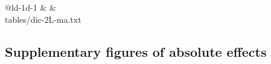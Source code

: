 \documentclass[11pt,final,fleqn]{article}\usepackage[]{graphicx}\usepackage[]{color}
\makeatletter
\theoremstyle{plain}
\newcommand*\ExpandableInput[1]{\@@input#1 }
\makeatother
\begin{document}
\begin{appendices}
\begin{table}[!ht]
\begin{center}
\begin{threeparttable}
\caption{Deviance information criterion for second line fixed effects meta-analysis} \label{tbl:dic-ma-2L}
\begin{tabularx}{\textwidth}{@{\extracolsep{\fill}}ld{-1}d{-1}}
\hline
{} &  &   \\
\hline
\ExpandableInput{tables/dic-2L-ma.txt}
\hline
\end{tabularx}
\scriptsize
\end{threeparttable}
\end{center}
\end{table}

\subsection{Supplementary figures of absolute effects}\label{app:2l-supp-figs}


\end{appendices}
\end{document}
